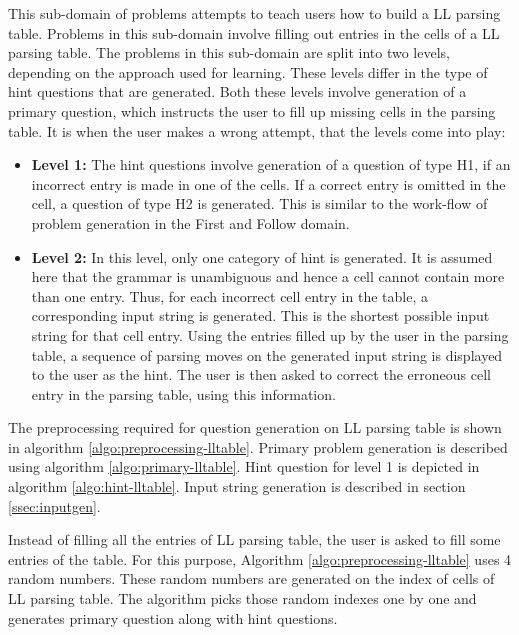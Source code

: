This sub-domain of problems attempts to teach users how to build a LL parsing table. Problems in this sub-domain involve filling out entries in the cells of a LL parsing table. The problems in this sub-domain are split into two levels, depending on the approach used for learning. These levels differ in the type of hint questions that are generated. Both these levels involve generation of a primary question, which instructs the user to fill up missing cells in the parsing table. It is when the user makes a wrong attempt, that the levels come into play:
\begin{itemize}
\item \textbf{Level 1:} The hint questions involve generation of a question of type H1, if an incorrect entry is made in one of the cells. If a correct entry is omitted in the cell, a question of type H2 is generated. This is similar to the work-flow of problem generation in the First and Follow domain. 
\item \textbf{Level 2:} In this level, only one category of hint is generated. It is assumed here that the grammar is unambiguous and hence a cell cannot contain more than one entry. Thus, for each incorrect cell entry in the table, a corresponding input string is generated. This is the shortest possible input string for that cell entry. Using the entries filled up by the user in the parsing table, a sequence of parsing moves on the generated input string is displayed to the user as the hint. The user is then asked to correct the erroneous cell entry in the parsing table, using this information.
\end{itemize}

The preprocessing required for question generation on LL parsing table is shown in algorithm \ref{algo:preprocessing-lltable}. Primary problem generation is described using algorithm \ref{algo:primary-lltable}. Hint question for level 1 is depicted in algorithm \ref{algo:hint-lltable}. Input string generation is described in section \ref{ssec:inputgen}.

Instead of filling all the entries of LL parsing table, the user is asked to fill some entries of the table. For this purpose, Algorithm \ref{algo:preprocessing-lltable} uses 4 random numbers. These random numbers are generated on the index of cells of LL parsing table. The algorithm picks those random indexes one by one and generates primary question along with hint questions.

